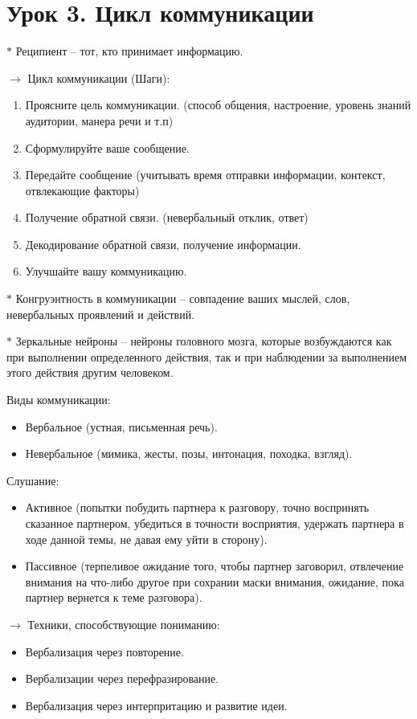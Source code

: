 \documentclass[12pt,a4paper]{report}
\begin{document}
\section*{Урок 3. Цикл коммуникации}
$\ast$ Реципиент -- тот, кто принимает информацию.

\bigskip
$\rightarrow$ Цикл коммуникации (Шаги):
\begin{enumerate}
	\item Проясните цель коммуникации. (способ общения, настроение, уровень знаний аудитории, манера речи и т.п)
	\item Сформулируйте ваше сообщение.
	\item Передайте сообщение (учитывать время отправки информации, контекст, отвлекающие факторы)
	\item Получение обратной связи. (невербальный отклик, ответ)
	\item Декодирование обратной связи, получение информации.
	\item Улучшайте вашу коммуникацию. 
\end{enumerate}

\medskip
$\ast$  Конгруэнтность в коммуникации -- совпадение ваших мыслей, слов, невербальных проявлений и действий.

\medskip
$\ast$ Зеркальные нейроны -- нейроны головного мозга, которые возбуждаются как при выполнении определенного действия, так и при наблюдении за выполнением этого действия другим человеком.

\medskip
Виды коммуникации:
\begin{itemize}
	\item Вербальное (устная, письменная речь).
	\item Невербальное (мимика, жесты, позы, интонация, походка, взгляд).
\end{itemize}
\medskip 
Слушание:
\begin{itemize}
	\item Активное (попытки побудить партнера к разговору, точно воспринять сказанное партнером, убедиться в точности восприятия, удержать партнера в ходе данной темы, не давая ему уйти в сторону).
	\item Пассивное (терпеливое ожидание того, чтобы партнер заговорил, отвлечение внимания на что-либо другое при сохрании маски внимания, ожидание, пока партнер вернется к теме разговора).
\end{itemize}

\medskip 
$\rightarrow$ Техники, способствующие пониманию:
\begin{itemize}
	\item Вербализация через повторение.
	\item Вербализации через перефразирование.
	\item Вербализация через интерпритацию и развитие идеи.
\end{itemize}
\end{document}
